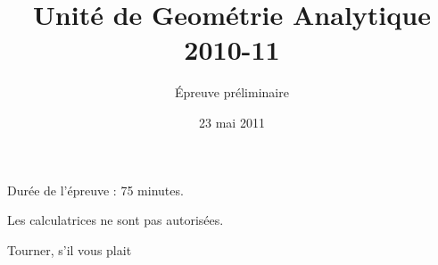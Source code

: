 


\title{Unité de Geométrie Analytique  2010-11 }
\author{Épreuve préliminaire}
\date{23 mai 2011}


\maketitle


\vspace{1cm}

Durée de l'épreuve : 75 minutes.  

Les calculatrices ne sont pas autorisées.  

\vspace{1cm}











\begin{flushright}
  Tourner, s'il vous plait
\end{flushright}
\newpage
{}






\corrChapitre{}



